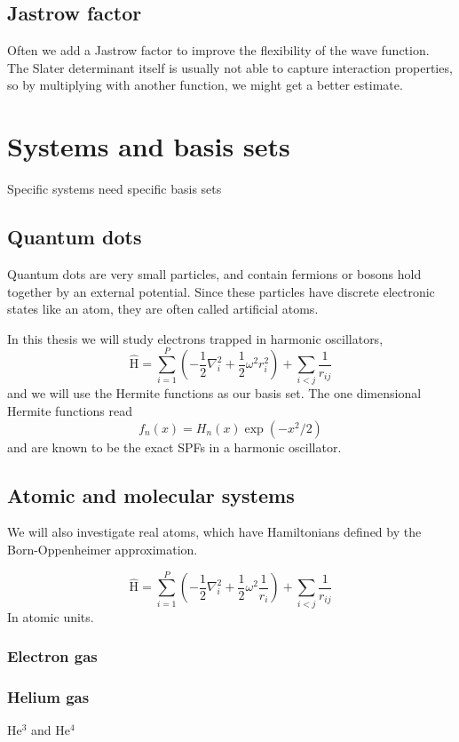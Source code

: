 \subsection{Jastrow factor} \label{subsubsec:jastrow}
Often we add a Jastrow factor to improve the flexibility of the wave function. The Slater determinant itself is usually not able to capture interaction properties, so by multiplying with another function, we might get a better estimate. 



\section{Systems and basis sets} \label{subsec:potentials}
Specific systems need specific basis sets

\subsection{Quantum dots} \label{subsubsec:quantumdots}
Quantum dots are very small particles, and contain fermions or bosons hold together by an external potential. Since these particles have discrete electronic states like an atom, they are often called artificial atoms. 

In this thesis we will study electrons trapped in harmonic oscillators,
\begin{equation}
\label{eq:HOHamiltonian}
\hat{\text{H}} = \sum_{i=1}^{P} (-\frac{1}{2} \nabla_i^2 + \frac{1}{2} \omega^2 r_i ^2) + \sum_{i<j} \frac{1}{r_{ij}} 
\end{equation}
and we will use the Hermite functions as our basis set. The one dimensional Hermite functions read
\begin{equation}
f_n(x)=H_n(x)\exp(-x^2/2)
\end{equation}
and are known to be the exact SPFs in a harmonic oscillator. 

\subsection{Atomic and molecular systems} \label{subsubsec:atomic}
We will also investigate real atoms, which have Hamiltonians defined by the Born-Oppenheimer approximation.  

\begin{equation}
\label{eq:AtomicHamiltonian}
\hat{\text{H}} = \sum_{i=1}^{P} (-\frac{1}{2} \nabla_i^2 + \frac{1}{2} \omega^2 \frac{1}{r_i}) + \sum_{i<j} \frac{1}{r_{ij}} 
\end{equation}
In atomic units. 

\subsubsection{Electron gas} \label{subsubsec:electrongas}
\subsubsection{Helium gas} \label{subsubsec:heliumgas}
He$^3$ and He$^4$

